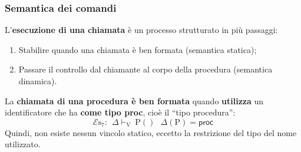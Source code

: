 \documentclass[a4paper]{article}
\newcommand{\dquotes}[1]{``#1''}
\begin{document}
	\subsubsection{Semantica dei comandi}
	
	L'\textbf{esecuzione di una chiamata} è un processo strutturato in più passaggi:
	\begin{enumerate}
		\item Stabilire quando una chiamata è ben formata (semantica statica);
		
		\item Passare il controllo dal chiamante al corpo della procedura (semantica dinamica).
	\end{enumerate}
	La \textbf{chiamata di una procedura è ben formata} quando \textbf{utilizza} un identificatore che ha \textbf{come tipo \textsf{proc}}, cioè il \dquotes{tipo procedura}:
	\begin{equation*}
		\mathcal{E}\mathrm{s}_{7}: \:\: \Delta\vdash_{\mathrm{V}} \: \mathrm{P()} \:\:\: \Delta\left(\mathrm{P}\right) = \textsf{proc}
	\end{equation*}
	Quindi, non esiste nessun vincolo statico, eccetto la restrizione del tipo del nome utilizzato.\newline
	
\end{document}
